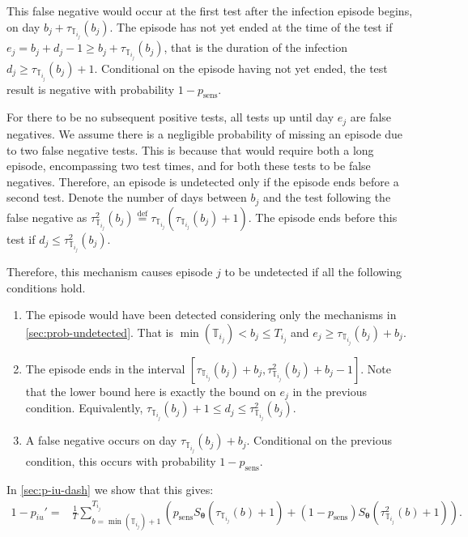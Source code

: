 \documentclass[12pt]{article}
\renewcommand{\vec}[1]{\bm{#1}}
\newcommand{\psens}{p_\text{sens}}
\newcommand{\sched}{\mathbb{T}}
\begin{document}
This false negative would occur at the first test after the infection episode begins, on day $b_j + \tau_{\sched_{i_j}}(b_j)$.
The episode has not yet ended at the time of the test if $e_j = b_j + d_j - 1 \geq b_j + \tau_{\sched_{i_j}}(b_j)$, that is the duration of the infection $d_j \geq \tau_{\sched_{i_j}}(b_j) + 1$.
Conditional on the episode having not yet ended, the test result is negative with probability $1 - \psens$.

For there to be no subsequent positive tests, all tests up until day $e_j$ are false negatives.
We assume there is a negligible probability of missing an episode due to two false negative tests.
This is because that would require both a long episode, encompassing two test times, and for both these tests to be false negatives.
Therefore, an episode is undetected only if the episode ends before a second test.
Denote the number of days between $b_j$ and the test following the false negative as $\tau^2_{\sched_{i_j}}(b_j) \stackrel{\text{def}}{=} \tau_{\sched_{i_j}}(\tau_{\sched_{i_j}}(b_j) + 1)$.
The episode ends before this test if $d_j \leq \tau^2_{\sched_{i_j}}(b_j)$.

Therefore, this mechanism causes episode $j$ to be undetected if all the following conditions hold.
\begin{enumerate}
    \item The episode would have been detected considering only the mechanisms in \cref{sec:prob-undetected}. That is $\min(\sched_{i_j}) < b_j \leq T_{i_j}$ and $e_j \geq \tau_{\sched_{i_j}}(b_j) + b_j$.
    \item The episode ends in the interval $[\tau_{\sched_{i_j}}(b_j) + b_j, \tau^2_{\sched_{i_j}}(b_j) + b_j - 1]$.
      Note that the lower bound here is exactly the bound on $e_j$ in the previous condition.
      Equivalently, $\tau_{\sched_{i_j}}(b_j) + 1 \leq d_j \leq \tau^2_{\sched_{i_j}}(b_j)$.
    \item A false negative occurs on day $\tau_{\sched_{i_j}}(b_j) + b_j$. Conditional on the previous condition, this occurs with probability $1 - \psens$.
\end{enumerate}

In \cref{sec:p-iu-dash} we show that this gives:
\begin{align}
1 - p_{iu}'
=& \frac{1}{T} \sum_{b=\min(\sched_{i_j}) + 1}^{T_{i_j}} \left( p_\text{sens} S_{\vec{\theta}}(\tau_{\sched_{i_j}}(b) + 1) + (1 - p_\text{sens}) S_{\vec{\theta}}(\tau^2_{\sched_{i_j}}(b) + 1)\right).
\label{imperf-test:eq:pit-prime}
\end{align}
\end{document}
